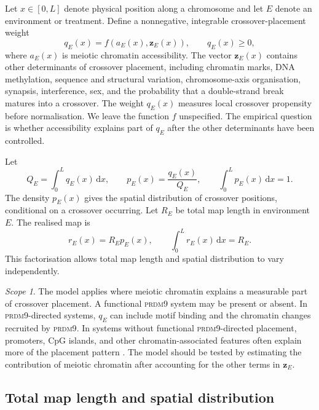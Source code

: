 \documentclass[11pt]{article}
\theoremstyle{remark}
\newtheorem*{scope}{Scope}
\newcommand{\dd}{\,\mathrm{d}}
\newcommand{\PRDM}{\textsc{prdm9}}
\begin{document}
Let $x\in[0,L]$ denote physical position along a chromosome and let $E$ denote an
environment or treatment. Define a nonnegative, integrable crossover-placement
weight
\begin{equation}
q_E(x)=f\!\left(a_E(x),\mathbf{z}_E(x)\right),
\qquad q_E(x)\ge 0,
\label{eq:q}
\end{equation}
where $a_E(x)$ is meiotic chromatin accessibility. The vector $\mathbf{z}_E(x)$
contains other determinants of crossover placement, including chromatin marks,
DNA methylation, sequence and structural variation, chromosome-axis organisation,
synapsis, interference, sex, and the probability that a double-strand break
matures into a crossover. The weight $q_E(x)$ measures local crossover propensity
before normalisation. We leave the function $f$ unspecified. The empirical
question is whether accessibility explains part of $q_E$ after the other
determinants have been controlled.

Let
\begin{equation}
Q_E=\int_0^L q_E(x)\dd x,
\qquad
p_E(x)=\frac{q_E(x)}{Q_E},
\qquad
\int_0^L p_E(x)\dd x=1.
\label{eq:p}
\end{equation}
The density $p_E(x)$ gives the spatial distribution of crossover positions,
conditional on a crossover occurring. Let $R_E$ be total map length in environment
$E$. The realised map is
\begin{equation}
r_E(x)=R_Ep_E(x),
\qquad
\int_0^L r_E(x)\dd x=R_E.
\label{eq:r}
\end{equation}
This factorisation allows total map length and spatial distribution to vary
independently.

\begin{scope}
The model applies where meiotic chromatin explains a measurable part of crossover
placement. A functional \PRDM{} system may be present or absent. In
\PRDM-directed systems, $q_E$ can include motif binding and the chromatin changes
recruited by \PRDM. In systems without functional \PRDM-directed placement,
promoters, CpG islands, and other chromatin-associated features often explain more
of the placement pattern \citep{baker2017,talbi2025}. The model should be tested by
estimating the contribution of meiotic chromatin after accounting for the other
terms in $\mathbf{z}_E$.
\end{scope}

\subsection{Total map length and spatial distribution}
\end{document}
